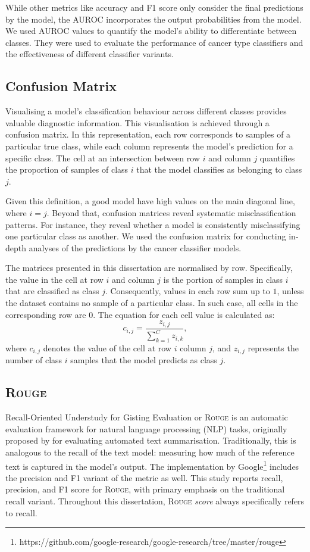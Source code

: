\documentclass{l4proj}
\begin{document}
While other metrics like accuracy and F1 score only consider the final predictions by the model, the AUROC incorporates the output probabilities from the model. We used AUROC values to quantify the model's ability to differentiate between classes. They were used to evaluate the performance of cancer type classifiers and the effectiveness of different classifier variants.

\subsection{Confusion Matrix}
Visualising a model's classification behaviour across different classes provides valuable diagnostic information. This visualisation is achieved through a confusion matrix. In this representation, each row corresponds to samples of a particular true class, while each column represents the model's prediction for a specific class. The cell at an intersection between row $i$ and column $j$ quantifies the proportion of samples of class $i$ that the model classifies as belonging to class $j$.

Given this definition, a good model have high values on the main diagonal line, where $i = j$. Beyond that, confusion matrices reveal systematic misclassification patterns. For instance, they reveal whether a model is consistently misclassifying one particular class as another. We used the confusion matrix for conducting in-depth analyses of the predictions by the cancer classifier models.

The matrices presented in this dissertation are normalised by row. Specifically, the value in the cell at row $i$ and column $j$ is the portion of samples in class $i$ that are classified as class $j$. Consequently, values in each row sum up to $1$, unless the dataset contains no sample of a particular class. In such case, all cells in the corresponding row are $0$. The equation for each cell value is calculated as:
\begin{equation}
    c_{i,j} = \frac{z_{i, j}}{\sum\limits_{k=1}^C z_{i,k}},
\end{equation}
where $c_{i,j}$ denotes the value of the cell at row $i$ column $j$, and $z_{i,j}$ represents the number of class $i$ samples that the model predicts as class $j$.

\subsection{\textsc{Rouge}}
Recall-Oriented Understudy for Gisting Evaluation or \textsc{Rouge} is an automatic evaluation framework for natural language processing (NLP) tasks, originally proposed by \cite{lin2004} for evaluating automated text summarisation. Traditionally, this is analogous to the recall of the text model: measuring how much of the reference text is captured in the model's output. The implementation by Google\footnote{https://github.com/google-research/google-research/tree/master/rouge} includes the precision and F1 variant of the metric as well. This study reports recall, precision, and F1 score for \textsc{Rouge}, with primary emphasis on the traditional recall variant. Throughout this dissertation, \textsc{Rouge} \emph{score} always specifically refers to recall.
\end{document}
